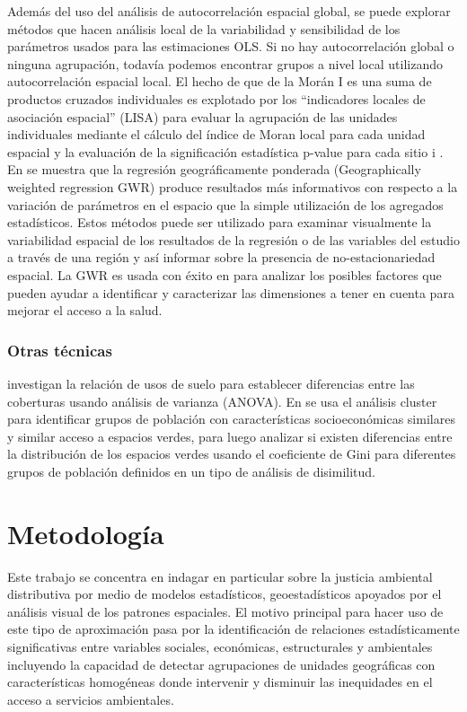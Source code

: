 \documentclass[12pt,]{book}
\begin{document}
Además del uso del análisis de autocorrelación espacial global, se puede
explorar métodos que hacen análisis local de la variabilidad y
sensibilidad de los parámetros usados para las estimaciones OLS. Si no
hay autocorrelación global o ninguna agrupación, todavía podemos
encontrar grupos a nivel local utilizando autocorrelación espacial
local. El hecho de que de la Morán I es una suma de productos cruzados
individuales es explotado por los ``indicadores locales de asociación
espacial'' (LISA) para evaluar la agrupación de las unidades
individuales mediante el cálculo del índice de Moran local para cada
unidad espacial y la evaluación de la significación estadística p-value
para cada sitio i \citep{talen_assessing_1998}. En
\citet{fotheringham_geographically_1998} se muestra que la regresión
geográficamente ponderada (Geographically weighted regression GWR)
produce resultados más informativos con respecto a la variación de
parámetros en el espacio que la simple utilización de los agregados
estadísticos. Estos métodos puede ser utilizado para examinar
visualmente la variabilidad espacial de los resultados de la regresión o
de las variables del estudio a través de una región y así informar sobre
la presencia de no-estacionariedad espacial. La GWR es usada con éxito
en \citep{comber_spatial_2011} para analizar los posibles factores que
pueden ayudar a identificar y caracterizar las dimensiones a tener en
cuenta para mejorar el acceso a la salud.

\subsection{Otras técnicas}\label{otras-tecnicas}

\citep{nesbitt_exploring_2016} investigan la relación de usos de suelo
para establecer diferencias entre las coberturas usando análisis de
varianza (ANOVA). En \citep{kabisch_green_2014} se usa el análisis
cluster para identificar grupos de población con características
socioeconómicas similares y similar acceso a espacios verdes, para luego
analizar si existen diferencias entre la distribución de los espacios
verdes usando el coeficiente de Gini para diferentes grupos de población
definidos en un tipo de análisis de disimilitud.

\chapter{Metodología}\label{meto}

Este trabajo se concentra en indagar en particular sobre la justicia
ambiental distributiva por medio de modelos estadísticos,
geoestadísticos apoyados por el análisis visual de los patrones
espaciales. El motivo principal para hacer uso de este tipo de
aproximación pasa por la identificación de relaciones estadísticamente
significativas entre variables sociales, económicas, estructurales y
ambientales incluyendo la capacidad de detectar agrupaciones de unidades
geográficas con características homogéneas donde intervenir y disminuir
las inequidades en el acceso a servicios ambientales.
\end{document}
